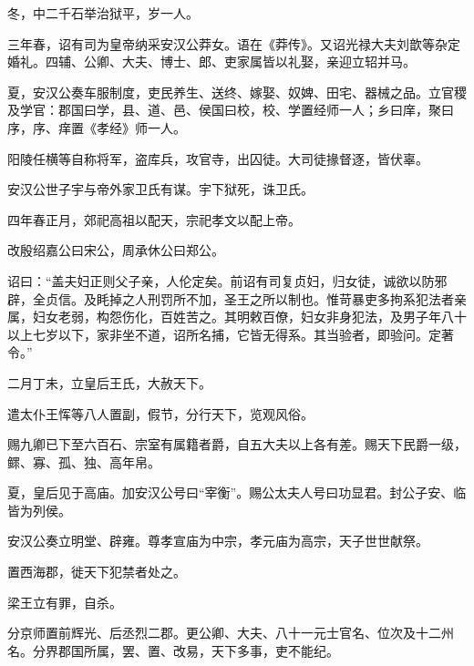 \documentclass[12pt,UTF8]{ctexbook}
\begin{document}
冬，中二千石举治狱平，岁一人。



三年春，诏有司为皇帝纳采安汉公莽女。语在《莽传》。又诏光禄大夫刘歆等杂定婚礼。四辅、公卿、大夫、博士、郎、吏家属皆以礼娶，亲迎立轺并马。



夏，安汉公奏车服制度，吏民养生、送终、嫁娶、奴婢、田宅、器械之品。立官稷及学官：郡国曰学，县、道、邑、侯国曰校，校、学置经师一人；乡曰庠，聚曰序，序、痒置《孝经》师一人。



阳陵任横等自称将军，盗库兵，攻官寺，出囚徒。大司徒掾督逐，皆伏辜。



安汉公世子宇与帝外家卫氏有谋。宇下狱死，诛卫氏。



四年春正月，郊祀高祖以配天，宗祀孝文以配上帝。



改殷绍嘉公曰宋公，周承休公曰郑公。



诏曰：“盖夫妇正则父子亲，人伦定矣。前诏有司复贞妇，归女徒，诚欲以防邪辟，全贞信。及眊掉之人刑罚所不加，圣王之所以制也。惟苛暴吏多拘系犯法者亲属，妇女老弱，构怨伤化，百姓苦之。其明敕百僚，妇女非身犯法，及男子年八十以上七岁以下，家非坐不道，诏所名捕，它皆无得系。其当验者，即验问。定著令。”



二月丁未，立皇后王氏，大赦天下。



遣太仆王恽等八人置副，假节，分行天下，览观风俗。



赐九卿已下至六百石、宗室有属籍者爵，自五大夫以上各有差。赐天下民爵一级，鳏、寡、孤、独、高年帛。



夏，皇后见于高庙。加安汉公号曰“宰衡”。赐公太夫人号曰功显君。封公子安、临皆为列侯。



安汉公奏立明堂、辟雍。尊孝宣庙为中宗，孝元庙为高宗，天子世世献祭。



置西海郡，徙天下犯禁者处之。



梁王立有罪，自杀。



分京师置前辉光、后丞烈二郡。更公卿、大夫、八十一元士官名、位次及十二州名。分界郡国所属，罢、置、改易，天下多事，吏不能纪。
\end{document}
